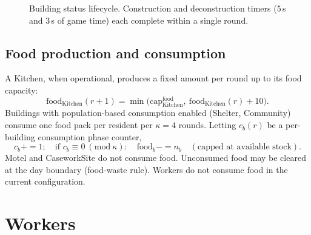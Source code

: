 \documentclass[11pt]{article}
\newcommand{\Round}{r}
\begin{document}
\begin{figure}[h]
\centering
{}
\caption{Building status lifecycle. Construction and deconstruction timers
($5$\,s and $3$\,s of game time) each complete within a single round.}
\label{fig:status}
\end{figure}

\subsection{Food production and consumption}
A Kitchen, when operational, produces a fixed amount per round up to its food
capacity:
\[
  \text{food}_{\text{Kitchen}}(\Round{+}1) =
  \min\!\big(\mathrm{cap}^{\text{food}}_{\text{Kitchen}},\
  \text{food}_{\text{Kitchen}}(\Round) + 10\big).
\]
Buildings with population-based consumption enabled (Shelter, Community) consume
one food pack per resident per $\kappa = 4$ rounds. Letting $c_b(\Round)$ be a
per-building consumption phase counter,
\[
  c_b \mathbin{+}{=} 1; \quad \text{if } c_b \equiv 0 \ (\mathrm{mod}\ \kappa):\quad
  \text{food}_b \mathbin{-}{=} n_b
  \quad(\text{capped at available stock}).
\]
Motel and CaseworkSite do not consume food. Unconsumed food may be cleared at the
day boundary (food-waste rule). Workers do not consume food in the current
configuration.

\section{Workers}
\label{sec:workers}
\end{document}

